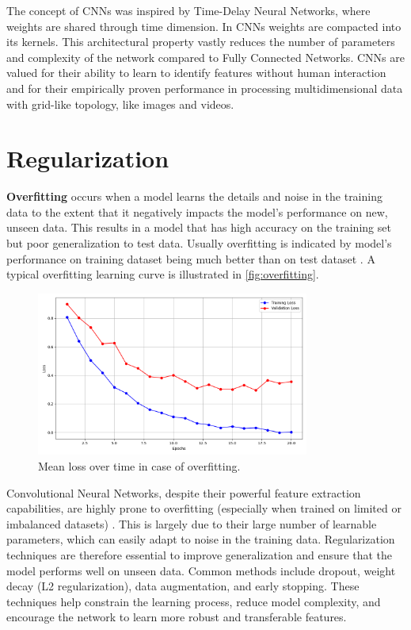The concept of CNNs was inspired by Time-Delay Neural Networks, where weights are shared through time dimension. In CNNs weights are compacted into its kernels. This architectural property vastly reduces the number of parameters and complexity of the network compared to Fully Connected Networks. CNNs are valued for their ability to learn to identify features without human interaction and for their empirically proven performance in processing multidimensional data with grid-like topology, like images and videos.

\section{Regularization}

\begin{definition}
  \textbf{Overfitting} \autocite{oshea2015introductionconvolutionalneuralnetworks} occurs when a model learns the details and noise in the training data to the extent that it negatively impacts the model’s performance on new, unseen data. This results in a model that has high accuracy on the training set but poor generalization to test data. Usually overfitting is indicated by model's performance on training dataset being much better than on test dataset \autocite{9944190}. A typical overfitting learning curve is illustrated in \autoref{fig:overfitting}.
\end{definition}

\begin{figure}[htbp]
  \centering
  \includegraphics[width=0.8\textwidth]{Images/overfitting.png}
  \caption{Mean loss over time in case of overfitting.}
  \label{fig:overfitting}
\end{figure}

Convolutional Neural Networks, despite their powerful feature extraction capabilities, are highly prone to overfitting (especially when trained on limited or imbalanced datasets) \autocite{alzubaidi2021review}. This is largely due to their large number of learnable parameters, which can easily adapt to noise in the training data. Regularization techniques are therefore essential to improve generalization and ensure that the model performs well on unseen data. Common methods include dropout, weight decay (L2 regularization), data augmentation, and early stopping. These techniques help constrain the learning process, reduce model complexity, and encourage the network to learn more robust and transferable features.

